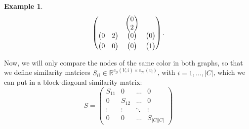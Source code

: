 \documentclass[a4paper,11pt]{report}
\newtheorem{example}[theorem]{Example}
\newcommand{\R}{{\mathbb R}}
\newcommand{\graf}{\mathscr{G}}
\newcommand{\grafeen}{\mathscr{H}}
\begin{document}
\begin{example}
$$\begin{pmatrix}
& \begin{pmatrix}
0\\
2\\
\end{pmatrix}\\ \smallskip
 \begin{pmatrix}
0 & 2\\
\end{pmatrix} & \begin{pmatrix}
 0\\
\end{pmatrix} & \begin{pmatrix}
 0\\
\end{pmatrix}\\
\begin{pmatrix}
 0 & 0\\
\end{pmatrix} & \begin{pmatrix}
 0\\
\end{pmatrix} & \begin{pmatrix}
 1\\
\end{pmatrix}\\
\end{pmatrix} .$$
\end{example}
Now, we will only compare the nodes of the same color in both graphs, so that we 
define similarity matrices $S_{ii} \in \R^{c_\graf(V,i)\times c_\grafeen(v_i)}$, with 
$i=1,\ldots,|C|$, which we can put in a block-diagonal similarity matrix:
$$S = \begin{pmatrix}
S_{11} & 0 & \ldots & 0\\
0 & S_{12} & \ldots & 0\\
\vdots & \vdots & \ddots & \vdots\\
0 & 0 & \ldots & S_{|C||C|}
\end{pmatrix}$$
\end{document}
